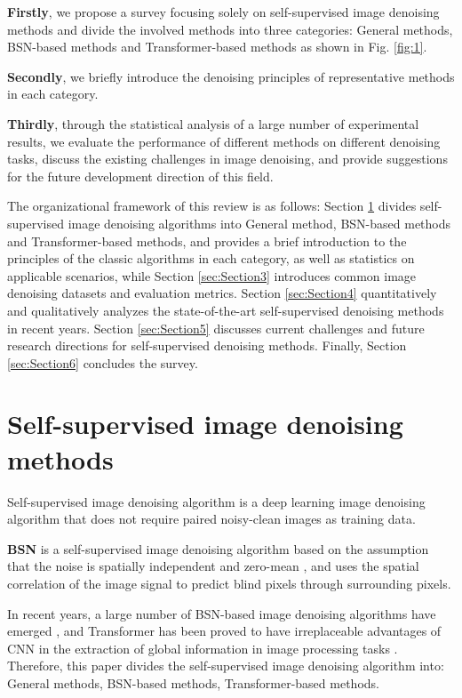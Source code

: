 \documentclass[conference]{IEEEtran}
\begin{document}
{\bf Firstly}, we propose a survey focusing solely on self-supervised image denoising methods and divide the involved methods into three categories: General methods, BSN-based methods and Transformer-based methods as shown in Fig. \ref{fig:1}.

{\bf Secondly}, we briefly introduce the denoising principles of representative methods in each category. 

{\bf Thirdly}, through the statistical analysis of a large number of experimental results, we evaluate the performance of different methods on different denoising tasks, discuss the existing challenges in image denoising, and provide suggestions for the future development direction of this field.

The organizational framework of this review is as follows: Section \ref{sec:Section2} divides self-supervised image denoising algorithms into General method, BSN-based methods and Transformer-based methods, and provides a brief introduction to the principles of the classic algorithms in each category, as well as statistics on applicable scenarios, while Section \ref{sec:Section3} introduces common image denoising datasets and evaluation metrics. Section \ref{sec:Section4} quantitatively and qualitatively analyzes the state-of-the-art self-supervised denoising methods in recent years. Section \ref{sec:Section5} discusses current challenges and future research directions for self-supervised denoising methods. Finally, Section \ref{sec:Section6} concludes the survey.

\section{Self-supervised image denoising methods}
\label{sec:Section2}
\noindent Self-supervised image denoising algorithm is a deep learning image denoising algorithm that does not require paired noisy-clean images as training data.

{\bf BSN} is a self-supervised image denoising algorithm based on the assumption that the noise is spatially independent and zero-mean \cite{krull2019noise2void}, and uses the spatial correlation of the image signal to predict blind pixels through surrounding pixels. 

In recent years, a large number of BSN-based image denoising algorithms have emerged \cite{krull2019noise2void,batson2019noise2self,laine2019high,wu2020unpaired, krull2020probabilistic, lee2022ap, honzatko2020efficient}, and Transformer has been proved to have irreplaceable advantages of CNN in the  extraction of global information in image processing tasks \cite{han2022survey, liu2021swin, zhao2022hybrid, khan2022transformers, zhou2023high, wang2023dealing, papkov2023swinia, li2021self}. Therefore, this paper divides the self-supervised image denoising algorithm into: General methods, BSN-based methods, Transformer-based methods.
\end{document}
